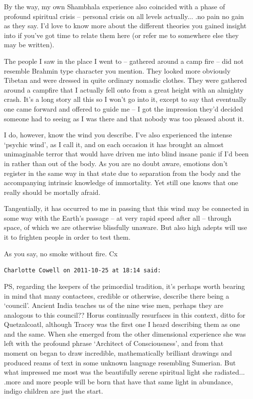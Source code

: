 \begin{footnotesize}
\begin{sffamily}
By the way, my own Shambhala experience also coincided with a phase of profound spiritual crisis -- personal crisis on all levels actually... .no pain no gain as they say. I'd love to know more about the different theories you gained insight into if you've got time to relate them here (or refer me to somewhere else they may be written).

The people I saw in the place I went to -- gathered around a camp fire -- did not resemble Brahmin type character you mention. They looked more obviously Tibetan and were dressed in quite ordinary nomadic clothes. They were gathered around a campfire that I actually fell onto from a great height with an almighty crash. It's a long story all this so I won't go into it, except to say that eventually one came forward and offered to guide me -- I got the impression they'd decided someone had to seeing as I was there and that nobody was too pleased about it.

I do, however, know the wind you describe. I've also experienced the intense `psychic wind', as I call it, and on each occasion it has brought an almost unimaginable terror that would have driven me into blind insane panic if I'd been in rather than out of the body. As you are no doubt aware, emotions don't register in the same way in that state due to separation from the body and the accompanying intrinsic knowledge of immortality. Yet still one knows that one really should be mortally afraid.

Tangentially, it has occurred to me in passing that this wind may be connected in some way with the Earth's passage -- at very rapid speed after all -- through space, of which we are otherwise blissfully unaware. But also high adepts will use it to frighten people in order to test them.

As you say, no smoke without fire. Cx

\hfill

\texttt{Charlotte Cowell on 2011-10-25 at 18:14 said:}

PS, regarding the keepers of the primordial tradition, it's perhaps worth bearing in mind that many contactees, credible or otherwise, describe there being a `council'. Ancient India teaches us of the nine wise men, perhaps they are analogous to this council?? Horus continually resurfaces in this context, ditto for Quetzalcoatl, although Tracey was the first one I heard describing them as one and the same. When she emerged from the other dimensional experience she was left with the profound phrase `Architect of Consciousness', and from that moment on began to draw incredible, mathematically brilliant drawings and produced reams of text in some unknown language resembling Sumerian. But what impressed me most was the beautifully serene spiritual light she radiated... .more and more people will be born that have that same light in abundance, indigo children are just the start.


\end{sffamily}
\end{footnotesize}
